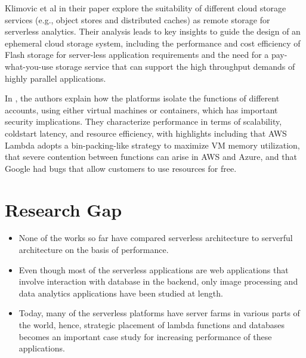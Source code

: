 Klimovic et al \cite{ephemeral} in their paper explore the suitability of different cloud storage services (e.g., object stores and distributed caches) as remote storage for serverless analytics. Their analysis leads to key insights to guide the design of an ephemeral cloud storage system, including the performance and cost efficiency of Flash storage for server-less application requirements and the need for a pay- what-you-use storage service that can support the high throughput demands of highly parallel applications.

In \cite{Wang_usenix_2018}, the authors explain how the platforms isolate the functions of different accounts, using either virtual machines or containers, which has important security implications. They characterize performance in terms of scalability, coldstart latency, and resource efficiency, with highlights including that AWS Lambda adopts a bin-packing-like strategy to maximize VM memory utilization, that severe contention between functions can arise in AWS and Azure, and that Google had bugs that allow customers to use resources for free.

\section{Research Gap}

\begin{itemize}
    \item None of the works so far have compared serverless architecture to serverful architecture on the basis of performance.
    \item Even though most of the serverless applications are web applications that involve interaction with database in the backend, only image processing and data analytics applications have been studied at length.
    \item Today, many of the serverless platforms have server farms in various parts of the world, hence, strategic placement of lambda functions and databases becomes an important case study for increasing performance of these applications.
\end{itemize}



